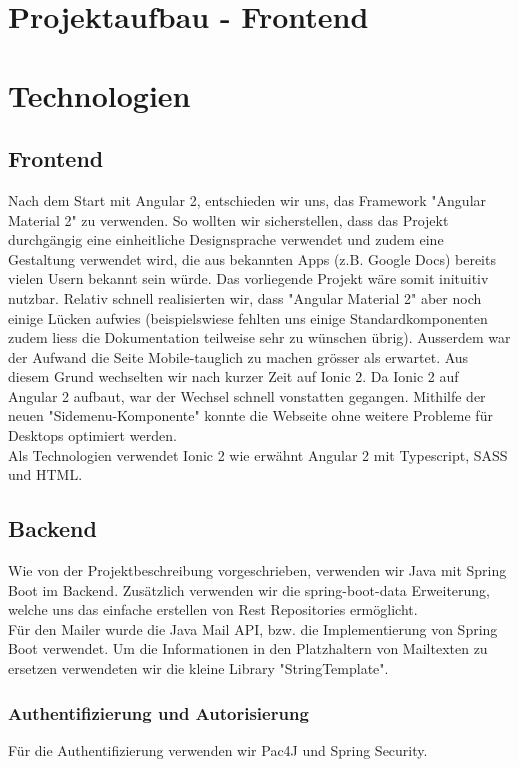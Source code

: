 \documentclass[11pt]{article} %
\begin{document}
\section{Projektaufbau - Frontend}

\newpage
\section{Technologien}

\subsection{Frontend}
Nach dem Start mit Angular 2, entschieden wir uns, das Framework "Angular Material 2" zu verwenden. So wollten wir sicherstellen, dass das Projekt durchgängig eine einheitliche Designsprache verwendet und zudem eine Gestaltung verwendet wird, die aus bekannten Apps (z.B. Google Docs) bereits vielen Usern bekannt sein würde. Das vorliegende Projekt wäre somit inituitiv nutzbar. Relativ schnell realisierten wir, dass "Angular Material 2" aber noch einige Lücken aufwies (beispielswiese fehlten uns einige Standardkomponenten zudem liess die Dokumentation teilweise sehr zu wünschen übrig). Ausserdem war der Aufwand die Seite Mobile-tauglich zu machen grösser als erwartet. Aus diesem Grund wechselten wir nach kurzer Zeit auf Ionic 2. Da Ionic 2 auf Angular 2 aufbaut, war der Wechsel schnell vonstatten gegangen. Mithilfe der neuen "Sidemenu-Komponente" konnte die Webseite ohne weitere Probleme für Desktops optimiert werden.
\\
Als Technologien verwendet Ionic 2 wie erwähnt Angular 2 mit Typescript, SASS und HTML.

\subsection{Backend}
Wie von der Projektbeschreibung vorgeschrieben, verwenden wir Java mit Spring Boot im Backend. Zusätzlich verwenden wir die spring-boot-data Erweiterung, welche uns das einfache erstellen von Rest Repositories ermöglicht.
\\
Für den Mailer wurde die Java Mail API, bzw. die Implementierung von Spring Boot verwendet. Um die Informationen in den Platzhaltern von Mailtexten zu ersetzen verwendeten wir die kleine Library "StringTemplate".

\subsubsection{Authentifizierung und Autorisierung}
Für die Authentifizierung verwenden wir Pac4J und Spring Security. 
\end{document}
